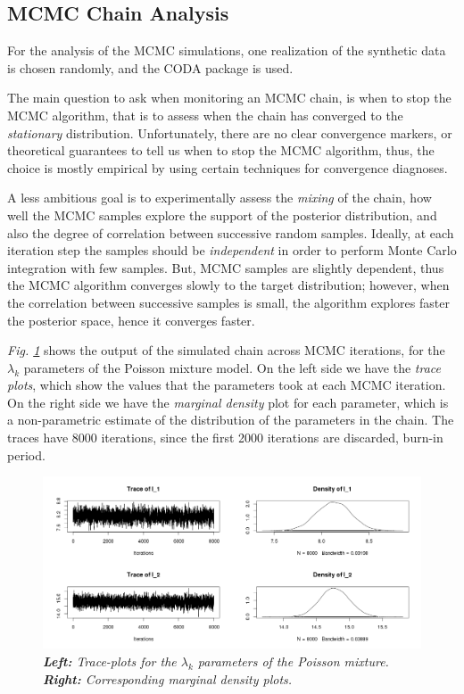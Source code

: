\subsection{MCMC Chain Analysis} \label{integr-synth-chain-sect}
For the analysis of the MCMC simulations, one realization of the synthetic data is chosen randomly, and the CODA package \citep{Plummer2006} is used. 

The main question to ask when monitoring an MCMC chain, is when to stop the MCMC algorithm, that is to assess when the chain has converged to the \emph{stationary} distribution. Unfortunately, there are no clear convergence markers, or theoretical guarantees to tell us when to stop the MCMC algorithm, thus, the choice is mostly empirical by using certain techniques for convergence diagnoses.

A less ambitious goal is to experimentally assess the \emph{mixing} of the chain, \ie how well the MCMC samples explore the support of the posterior distribution, and also the degree of correlation between successive random samples. Ideally, at each iteration step the samples should be \emph{independent} in order to perform Monte Carlo integration with few samples. But, MCMC samples are slightly dependent, thus the MCMC algorithm converges slowly to the target distribution; however, when the correlation between successive samples is small, the algorithm explores faster the posterior space, hence it converges faster.

\emph{Fig. \ref{trace-density-l-pic}} shows the output of the simulated chain across MCMC iterations, for the $\lambda_{k}$ parameters of the Poisson mixture model. On the left side we have the \emph{trace plots}, which show the values that the parameters took at each MCMC iteration. On the right side we have the \emph{marginal density} plot for each parameter, which is a non-parametric estimate of the distribution of the parameters in the chain. The traces have 8000 iterations, since the first 2000 iterations are discarded, \ie burn-in period.
\begin{figure}[!ht]
\begin{center}
 \includegraphics[scale = 0.4]{images/traceDensityL.png}
\caption{\emph{\textbf{Left:} Trace-plots for the $\lambda_{k}$ parameters of the Poisson mixture. \textbf{Right:} Corresponding marginal density plots.}}
\label{trace-density-l-pic}
\end{center}
\end{figure}

